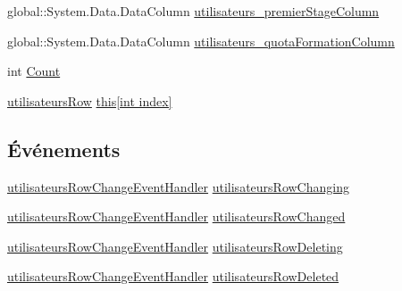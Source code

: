\begin{DoxyCompactItemize}
\item 
global\+::\+System.\+Data.\+Data\+Column \hyperlink{classforma_1_1formadb_data_set_1_1utilisateurs_data_table_a8bc58f6fe7de445f636384eed8fee1ea}{utilisateurs\+\_\+premier\+Stage\+Column}
\item 
global\+::\+System.\+Data.\+Data\+Column \hyperlink{classforma_1_1formadb_data_set_1_1utilisateurs_data_table_a8d25ecd222ebc83ff3927a5f792ce6c8}{utilisateurs\+\_\+quota\+Formation\+Column}
\item 
int \hyperlink{classforma_1_1formadb_data_set_1_1utilisateurs_data_table_a84dc5cd6e38518d6f241ce6c57e98947}{Count}
\item 
\hyperlink{classforma_1_1formadb_data_set_1_1utilisateurs_row}{utilisateurs\+Row} \hyperlink{classforma_1_1formadb_data_set_1_1utilisateurs_data_table_a075089b859f9d0bfebca686e47e10bf2}{this\mbox{[}int index\mbox{]}}
\end{DoxyCompactItemize}
\subsection*{Événements}
\begin{DoxyCompactItemize}
\item 
\hyperlink{classforma_1_1formadb_data_set_a1b81714a5a0dd27994063c57cb9ae217}{utilisateurs\+Row\+Change\+Event\+Handler} \hyperlink{classforma_1_1formadb_data_set_1_1utilisateurs_data_table_a1cc4e5df545d371ff4a425ab8d75ed65}{utilisateurs\+Row\+Changing}
\item 
\hyperlink{classforma_1_1formadb_data_set_a1b81714a5a0dd27994063c57cb9ae217}{utilisateurs\+Row\+Change\+Event\+Handler} \hyperlink{classforma_1_1formadb_data_set_1_1utilisateurs_data_table_ad73ce30279263fbc9123e49f804cd4f2}{utilisateurs\+Row\+Changed}
\item 
\hyperlink{classforma_1_1formadb_data_set_a1b81714a5a0dd27994063c57cb9ae217}{utilisateurs\+Row\+Change\+Event\+Handler} \hyperlink{classforma_1_1formadb_data_set_1_1utilisateurs_data_table_a23794d228bce8ca049221af0eb66a3fc}{utilisateurs\+Row\+Deleting}
\item 
\hyperlink{classforma_1_1formadb_data_set_a1b81714a5a0dd27994063c57cb9ae217}{utilisateurs\+Row\+Change\+Event\+Handler} \hyperlink{classforma_1_1formadb_data_set_1_1utilisateurs_data_table_a53ecd0e63d00b2920305cd695da42463}{utilisateurs\+Row\+Deleted}
\end{DoxyCompactItemize}



